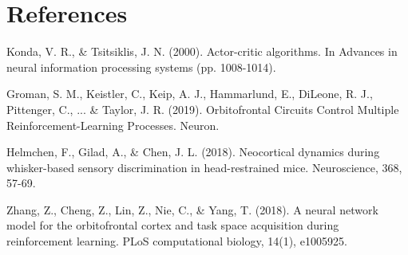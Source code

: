 \documentclass[]{article}
\begin{document}
\section{References}

Konda, V. R., \& Tsitsiklis, J. N. (2000). Actor-critic algorithms. In Advances in neural information processing systems (pp. 1008-1014).

Groman, S. M., Keistler, C., Keip, A. J., Hammarlund, E., DiLeone, R. J., Pittenger, C., ... \& Taylor, J. R. (2019). Orbitofrontal Circuits Control Multiple Reinforcement-Learning Processes. Neuron.

Helmchen, F., Gilad, A., \& Chen, J. L. (2018). Neocortical dynamics during whisker-based sensory discrimination in head-restrained mice. Neuroscience, 368, 57-69.

Zhang, Z., Cheng, Z., Lin, Z., Nie, C., \& Yang, T. (2018). A neural network model for the orbitofrontal cortex and task space acquisition during reinforcement learning. PLoS computational biology, 14(1), e1005925.
\end{document}
